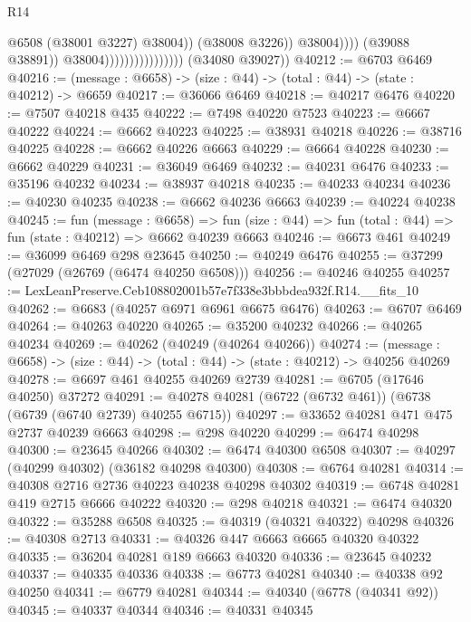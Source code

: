 \begin{lexlean}{R14}
\begin{coremodule}
                                                      @6508
                                                      (@38001 @3227)
                                                      @38004))
                                                  (@38008 @3226))
                                                @38004))))
                                        (@39088 @38891))
                                      @38004))))))))))))))))
      (@34080 @39027))
@40212 := @6703 @6469
@40216 := (message : @6658) -> (size : @44) -> (total : @44) -> (state : @40212) -> @6659
@40217 := @36066 @6469
@40218 := @40217 @6476
@40220 := @7507 @40218 @435
@40222 := @7498 @40220 @7523
@40223 := @6667 @40222
@40224 := @6662 @40223
@40225 := @38931 @40218
@40226 := @38716 @40225
@40228 := @6662 @40226 @6663
@40229 := @6664 @40228
@40230 := @6662 @40229
@40231 := @36049 @6469
@40232 := @40231 @6476
@40233 := @35196 @40232
@40234 := @38937 @40218
@40235 := @40233 @40234
@40236 := @40230 @40235
@40238 := @6662 @40236 @6663
@40239 := @40224 @40238
@40245 := fun (message : @6658) =>
  fun (size : @44) => fun (total : @44) => fun (state : @40212) => @6662 @40239 @6663
@40246 := @6673 @461
@40249 := @36099 @6469 @298 @23645
@40250 := @40249 @6476
@40255 := @37299 (@27029 (@26769 (@6474 @40250 @6508)))
@40256 := @40246 @40255
@40257 := LexLeanPreserve.Ceb108802001b57e7f338e3bbbdea932f.R14.__fits_10
@40262 := @6683 (@40257 @6971 @6961 @6675 @6476)
@40263 := @6707 @6469
@40264 := @40263 @40220
@40265 := @35200 @40232
@40266 := @40265 @40234
@40269 := @40262 (@40249 (@40264 @40266))
@40274 := (message : @6658) -> (size : @44) -> (total : @44) -> (state : @40212) -> @40256 @40269
@40278 := @6697 @461 @40255 @40269 @2739
@40281 := @6705 (@17646 @40250) @37272
@40291 := @40278 @40281 (@6722 (@6732 @461)) (@6738 (@6739 (@6740 @2739) @40255 @6715))
@40297 := @33652 @40281 @471 @475 @2737 @40239 @6663
@40298 := @298 @40220
@40299 := @6474 @40298
@40300 := @23645 @40266
@40302 := @6474 @40300 @6508
@40307 := @40297 (@40299 @40302) (@36182 @40298 @40300)
@40308 := @6764 @40281
@40314 := @40308 @2716 @2736 @40223 @40238 @40298 @40302
@40319 := @6748 @40281 @419 @2715 @6666 @40222
@40320 := @298 @40218
@40321 := @6474 @40320
@40322 := @35288 @6508
@40325 := @40319 (@40321 @40322) @40298
@40326 := @40308 @2713
@40331 := @40326 @447 @6663 @6665 @40320 @40322
@40335 := @36204 @40281 @189 @6663 @40320
@40336 := @23645 @40232
@40337 := @40335 @40336
@40338 := @6773 @40281
@40340 := @40338 @92 @40250
@40341 := @6779 @40281
@40344 := @40340 (@6778 (@40341 @92))
@40345 := @40337 @40344
@40346 := @40331 @40345

\end{coremodule}
\end{lexlean}
